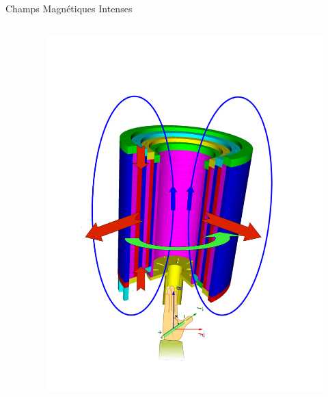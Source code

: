 \begin{frame}{Champs Magnétiques Intenses}
\begin{columns}[c]
\begin{column}{.7\linewidth}
    \end{column}
    \begin{column}{.42\linewidth}
      \vspace*{-0.5cm}
      \begin{figure}[H]
        \centering
        \includegraphics[scale=0.26]{Figures/cmi/Schema_Forces.pdf}
      \end{figure}
    \end{column}
  \end{columns}
\end{frame}

